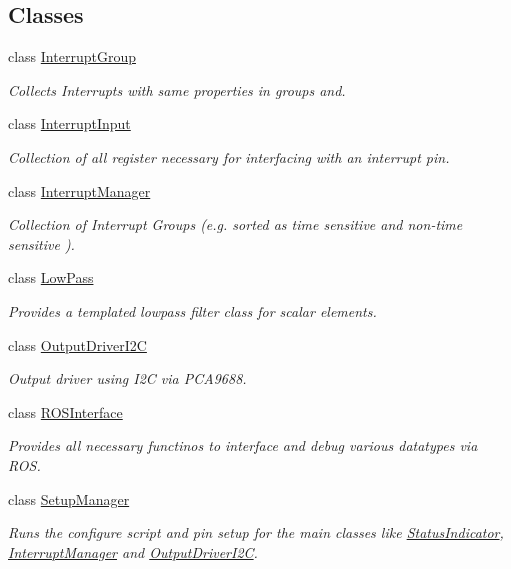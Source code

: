 \subsection*{Classes}
\begin{DoxyCompactItemize}
\item 
class \hyperlink{classSPMB_1_1InterruptGroup}{Interrupt\+Group}
\begin{DoxyCompactList}\small\item\em Collects Interrupts with same properties in groups and. \end{DoxyCompactList}\item 
class \hyperlink{classSPMB_1_1InterruptInput}{Interrupt\+Input}
\begin{DoxyCompactList}\small\item\em Collection of all register necessary for interfacing with an interrupt pin. \end{DoxyCompactList}\item 
class \hyperlink{classSPMB_1_1InterruptManager}{Interrupt\+Manager}
\begin{DoxyCompactList}\small\item\em Collection of Interrupt Groups (e.\+g. sorted as time sensitive and non-\/time sensitive ). \end{DoxyCompactList}\item 
class \hyperlink{classSPMB_1_1LowPass}{Low\+Pass}
\begin{DoxyCompactList}\small\item\em Provides a templated lowpass filter class for scalar elements. \end{DoxyCompactList}\item 
class \hyperlink{classSPMB_1_1OutputDriverI2C}{Output\+Driver\+I2C}
\begin{DoxyCompactList}\small\item\em Output driver using I2C via P\+C\+A9688. \end{DoxyCompactList}\item 
class \hyperlink{classSPMB_1_1ROSInterface}{R\+O\+S\+Interface}
\begin{DoxyCompactList}\small\item\em Provides all necessary functinos to interface and debug various datatypes via R\+OS. \end{DoxyCompactList}\item 
class \hyperlink{classSPMB_1_1SetupManager}{Setup\+Manager}
\begin{DoxyCompactList}\small\item\em Runs the configure script and pin setup for the main classes like \hyperlink{classSPMB_1_1StatusIndicator}{Status\+Indicator}, \hyperlink{classSPMB_1_1InterruptManager}{Interrupt\+Manager} and \hyperlink{classSPMB_1_1OutputDriverI2C}{Output\+Driver\+I2C}. \end{DoxyCompactList}\item 

\end{DoxyCompactItemize}
